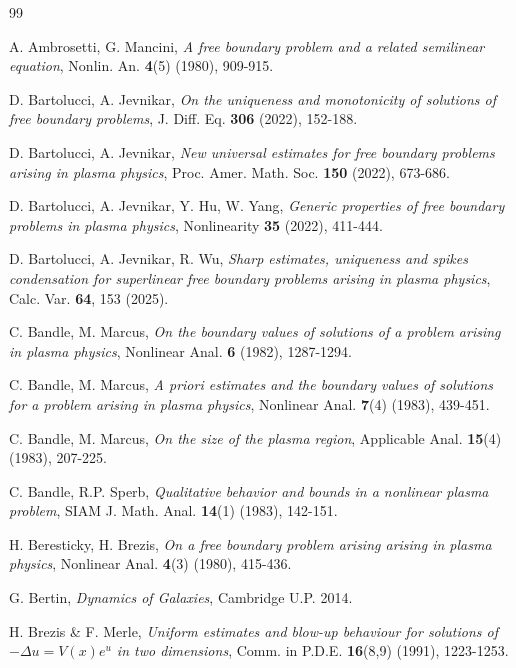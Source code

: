 \documentclass[10pt]{amsart}
\begin{document}
\bigskip


\begin{thebibliography}{99}

 A. Ambrosetti, G. Mancini, {\em A free boundary problem and a related
semilinear equation}, Nonlin. An. {\bf 4}(5) (1980), 909-915.

 D. Bartolucci, A. Jevnikar,
{\em On the uniqueness and monotonicity of solutions of free boundary problems}, J. Diff. Eq.
{\bf 306} (2022), 152-188.

 D. Bartolucci, A. Jevnikar,
{\em New universal estimates for free boundary problems arising in plasma physics},
Proc. Amer. Math. Soc. {\bf 150} (2022), 673-686.

 D. Bartolucci, A. Jevnikar, Y. Hu,  W. Yang,
{\em Generic properties of free boundary problems in plasma physics}, {Nonlinearity} {\bf 35} (2022), 411-444.

 D. Bartolucci, A. Jevnikar, R. Wu,
{\em Sharp estimates, uniqueness and spikes condensation for superlinear free boundary problems arising in plasma physics},
Calc. Var. {\bf 64}, 153 (2025).

 C. Bandle, M. Marcus, {\em On the boundary values of solutions of a problem
arising in plasma physics}, Nonlinear Anal.  {\bf 6} (1982), 1287-1294.

 C. Bandle, M. Marcus, {\em A priori estimates and the boundary values of
solutions for a problem arising in plasma physics}, Nonlinear Anal. {\bf 7}(4)  (1983), 439-451.

 C. Bandle, M. Marcus,
{\em On the size of the plasma region}, Applicable Anal. {\bf 15}(4)  (1983), 207-225.

 C. Bandle, R.P. Sperb,
{\em Qualitative behavior and bounds in a nonlinear plasma problem}, SIAM J. Math. Anal. {\bf 14}(1) (1983), 142-151.

 H. Beresticky, H. Brezis,
{\em On a free boundary problem arising arising in plasma physics},
Nonlinear Anal. {\bf 4}(3) (1980), 415-436.

 G. Bertin, {\sl Dynamics of Galaxies}, Cambridge U.P. 2014.

 H. Brezis \& F. Merle,
{\em Uniform estimates and blow-up behaviour for
solutions of $-\Delta u = V(x)e^{u}$ in two dimensions},
{Comm. in P.D.E.}  {\bf 16}(8,9) (1991), 1223-1253.


\end{thebibliography}
\end{document}
